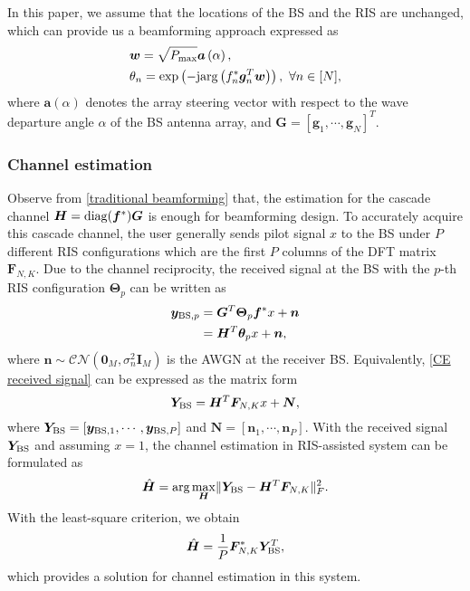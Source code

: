 \documentclass[12pt,draftclsnofoot,journal,onecolumn]{IEEEtran}
\theoremstyle{nonumberplain}
\def \exp {\text{exp}}
\def \arg {\text{arg}}
\begin{document}
        
        In this paper, we assume that the locations of the \ac{BS} and the RIS are unchanged, which can provide us a beamforming approach expressed as
                \begin{subequations}
\label{traditional beamforming}
\begin{align}
\label{w_optimal}
&\bm w=\sqrt{P_{\rm max}}\bm a\left(\alpha\right),\\
\label{theta_optimal}
&\theta_{n} = \exp\left(-{\rm j} \arg\left(f_{n}^{*}\bm g_{n}^{T}\bm w\right)\right),~\forall n\in [N],
\end{align}
\end{subequations}
where $\bm a(\alpha)$ denotes the array steering vector with respect to the wave departure angle $\alpha$ of the BS antenna array, and $\bm G = \left[\bm g_{1}, \cdots, \bm g_{N}\right]^{T}$.

\subsubsection{Channel estimation}
Observe from \eqref{traditional beamforming} that, the estimation for the cascade channel ${\bm H} = {\rm diag}({\bm f}^{*})\bm G$ is enough for beamforming design.
To accurately acquire this cascade channel, the user generally sends pilot signal $x$ to the BS under $P$ different RIS configurations which are the first $P$ columns of the DFT matrix $\bm F_{N,K}$. Due to the channel reciprocity, the received signal at the BS with the $p$-th RIS configuration $\bm \Theta_{p}$ can be written as \cite{atapattu2020reconfigurable}
    \begin{equation}
    \label{CE received signal}
    \begin{aligned}
            {\bm y}_{{\rm BS}, p} &={\bm G}^{T} {\bm \Theta}_p\bm f^{*} x+\bm n
            \\&=\bm H^{T} {\bm \theta}_p x+\bm n,
    \end{aligned}
    \end{equation}
    where $\bm n\sim \mathcal{CN}\left( \bm 0_{M}, \sigma_{n}^{2}\bm I_{M}\right)$ is the \ac{AWGN} at the receiver BS.
Equivalently, \eqref{CE received signal} can be expressed as the matrix form
    \begin{equation}
    \label{eqn:MMSE_CE}
        {\bm Y}_{\rm BS}=\bm H^{T} \bm F_{N,K}x + {\bm N},
    \end{equation}
    where ${\bm Y}_{\rm BS}=\left[\bm y_{{\rm BS}, 1},\cdots,\bm y_{{\rm BS}, P}\right]$ and $\bm N = \left[ \bm n_{1},\cdots,\bm n_{P}\right]$.
With the received signal $\bm Y_{\rm BS}$ and assuming $x=1$, the channel estimation in RIS-assisted system can be formulated as 
    \begin{equation}
        \hat{\bm H} = \arg\max_{\bm H} \lVert {\bm Y}_{\rm BS} - {\bm H^{T}} {\bm F}_{N,K}\rVert_{F}^2.
    \end{equation}
    With the least-square criterion, we obtain
    \begin{equation}
        \hat{\bm H} = \frac{1}{P}{\bm F}_{N,K}^{*}{\bm Y}_{\rm BS}^{T},
    \end{equation}
    which provides a solution for channel estimation in this system.
\end{document}
